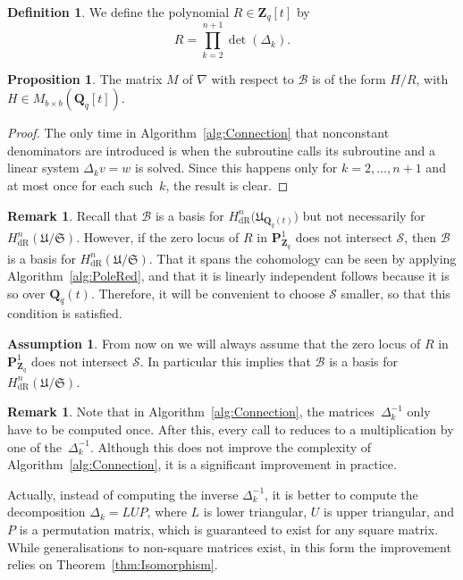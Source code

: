 \documentclass[a4paper,11pt]{article}
\numberwithin{equation}{section}
\newcommand{\ZZ}{\mathbf{Z}} %
\newcommand{\QQ}{\mathbf{Q}} %
\providecommand{\HdR}{H_{\text{dR}}}    %
\providecommand{\cB}{\mathcal{B}} %
\theoremstyle{definition}
\newtheorem{prop}[thm]{Proposition}
\newtheorem{defn}[thm]{Definition}
\newtheorem{rem}[thm]{Remark}
\newtheorem{assump}[thm]{Assumption}
\begin{document}
\begin{defn} \label{defn:resultant}
We define the polynomial $R \in \ZZ_q[t]$ by
\[
R = \prod_{k=2}^{n+1}  \det(\Delta_k).
\]
\end{defn}

\begin{prop} \label{thm:denom}
The matrix $M$ of $\nabla$ with respect to $\cB$ is of the form
$H/R$, with $H \in M_{b \times b}(\QQ_q[t])$.
\end{prop}

\begin{proof}
The only time in Algorithm~\ref{alg:Connection} that nonconstant denominators 
are introduced is when the subroutine {} calls its subroutine 
{} and a linear system $\Delta_k v = w$ is solved. Since this 
happens only for $k=2, \dotsc, n+1$ and at most once for each 
such~$k$, the result is clear.
\end{proof}

\begin{rem}
Recall that $\cB$ is a basis for $\HdR^n\bigl(\mathfrak{U}_{\QQ_q(t)}\bigr)$ 
but not necessarily for $\HdR^n(\mathfrak{U}/\mathfrak{S})$. However, if the 
zero locus of $R$ in $\mathbf{P}^1_{\ZZ_q}$ does not intersect $\mathcal{S}$, 
then $\cB$ is a basis for $\HdR^n(\mathfrak{U}/\mathfrak{S})$. That it 
spans the cohomology can be seen by applying Algorithm~\ref{alg:PoleRed}, and that it 
is linearly independent follows because it is so over $\QQ_q(t)$. Therefore, it will 
be convenient to choose $\mathcal{S}$ smaller, so that this condition is satisfied. 
\end{rem}

\begin{assump} \label{assump:R}
From now on we will always assume that the zero locus of $R$ in 
$\mathbf{P}^1_{\ZZ_q}$ does not intersect $\mathcal{S}$. In particular
this implies that $\cB$ is a basis for $\HdR^n(\mathfrak{U}/\mathfrak{S})$.
\end{assump}

\begin{rem} 
Note that in Algorithm~\ref{alg:Connection}, the matrices~$\Delta_k^{-1}$ 
only have to be computed once. After this, every call to {} 
reduces to a multiplication by one of the~$\Delta_k^{-1}$.  Although this 
does not improve the complexity of Algorithm~\ref{alg:Connection}, it is 
a significant improvement in practice.

Actually, instead of computing the inverse $\Delta_k^{-1}$, it is better 
to compute the decomposition $\Delta_k = L U P$, where $L$ is lower 
triangular, $U$ is upper triangular, and $P$ is a permutation matrix, which 
is guaranteed to exist for any square matrix.  While generalisations to 
non-square matrices exist, in this form the improvement relies on 
Theorem~\ref{thm:Isomorphism}.
\end{rem}
\end{document}
